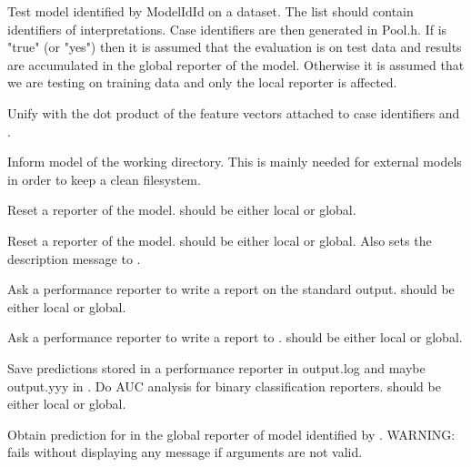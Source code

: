 \begin{description}
Test model identified by ModelIdId on a dataset. The list
 should contain identifiers of interpretations. Case
identifiers are then generated in Pool.h. If  is "true" (or
"yes") then it is assumed that the evaluation is on test data and
results are accumulated in the global reporter of the
model. Otherwise it is assumed that we are testing on training data
and only the local reporter is affected.

Unify  with the dot product of the feature vectors attached to
case identifiers  and .

Inform model of the working directory. This is mainly needed for
external models in order to keep a clean filesystem.

Reset a reporter of the model.  should be either local or
global. 

Reset a reporter of the model.  should be either local or
global. Also sets the description message to .

Ask a performance reporter to write a report on the
standard output.  should be either local or global.

Ask a performance reporter to write a report to . 
should be either local or global.

Save predictions stored in a performance reporter in output.log
and maybe output.yyy in . Do AUC analysis for binary
classification reporters.  should be either local or global.

Obtain prediction for  in the global reporter of model
identified by . WARNING: fails without displaying any message
if arguments are not valid.
\end{description}

